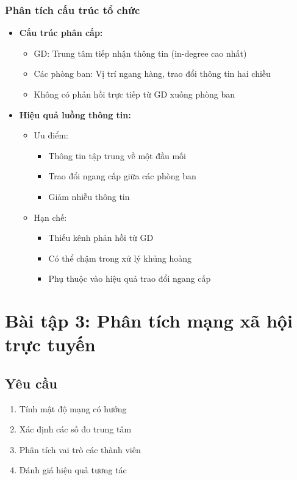 \documentclass[12pt,a4paper]{article}
\begin{document}
\subsubsection{Phân tích cấu trúc tổ chức}
\begin{itemize}
\item \textbf{Cấu trúc phân cấp:}
    \begin{itemize}
    \item GD: Trung tâm tiếp nhận thông tin (in-degree cao nhất)
    \item Các phòng ban: Vị trí ngang hàng, trao đổi thông tin hai chiều
    \item Không có phản hồi trực tiếp từ GD xuống phòng ban
    \end{itemize}
\item \textbf{Hiệu quả luồng thông tin:}
    \begin{itemize}
    \item Ưu điểm:
        \begin{itemize}
        \item Thông tin tập trung về một đầu mối
        \item Trao đổi ngang cấp giữa các phòng ban
        \item Giảm nhiễu thông tin
        \end{itemize}
    \item Hạn chế:
        \begin{itemize}
        \item Thiếu kênh phản hồi từ GD
        \item Có thể chậm trong xử lý khủng hoảng
        \item Phụ thuộc vào hiệu quả trao đổi ngang cấp
        \end{itemize}
    \end{itemize}
\end{itemize}

\section{Bài tập 3: Phân tích mạng xã hội trực tuyến}

\subsection{Yêu cầu}
\begin{enumerate}
\item Tính mật độ mạng có hướng
\item Xác định các số đo trung tâm
\item Phân tích vai trò các thành viên
\item Đánh giá hiệu quả tương tác
\end{enumerate}
\end{document}
